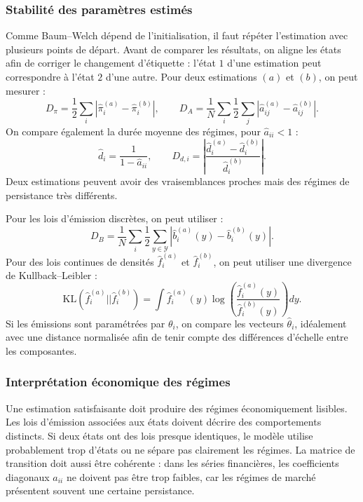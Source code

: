\documentclass[11pt]{article}
\begin{document}
\subsubsection{Stabilité des paramètres estimés}

Comme Baum--Welch dépend de l'initialisation, il faut répéter l'estimation avec plusieurs points de départ. Avant de comparer les résultats, on aligne les états afin de corriger le changement d'étiquette : l'état \(1\) d'une estimation peut correspondre à l'état \(2\) d'une autre. Pour deux estimations \((a)\) et \((b)\), on peut mesurer :
\[
D_{\pi}=\frac12\sum_i
\left|\widehat{\pi}^{(a)}_i-\widehat{\pi}^{(b)}_i\right|,
\qquad
D_A=
\frac1N\sum_i\frac12\sum_j
\left|\widehat{a}^{(a)}_{ij}-\widehat{a}^{(b)}_{ij}\right|.
\]
On compare également la durée moyenne des régimes, pour $\widehat{a}_{ii} < 1$ :
\[
\widehat{d}_i=\frac{1}{1-\widehat{a}_{ii}},
\qquad
D_{d,i}
=
\left|
\frac{\widehat{d}^{(a)}_i-\widehat{d}^{(b)}_i}
{\widehat{d}^{(b)}_i}
\right|.
\]
Deux estimations peuvent avoir des vraisemblances proches mais des régimes de persistance très différents.

Pour les lois d'émission discrètes, on peut utiliser :
\[
D_B=
\frac1N\sum_i
\frac12\sum_{y\in\mathcal{Y}}
\left|\widehat{b}^{(a)}_i(y)-\widehat{b}^{(b)}_i(y)\right|.
\]
Pour des lois continues de densités \(\widehat f_i^{(a)}\) et \(\widehat f_i^{(b)}\), on peut utiliser une divergence de Kullback--Leibler :
\[
\mathrm{KL}(\widehat f_i^{(a)}||\widehat f_i^{(b)})
=
\int \widehat f_i^{(a)}(y)
\log\left(
\frac{\widehat f_i^{(a)}(y)}
{\widehat f_i^{(b)}(y)}
\right)dy.
\]
Si les émissions sont paramétrées par \(\theta_i\), on compare les vecteurs \(\widehat{\theta}_i\), idéalement avec une distance normalisée afin de tenir compte des différences d'échelle entre les composantes.

\subsubsection{Interprétation économique des régimes}

Une estimation satisfaisante doit produire des régimes économiquement lisibles. Les lois d'émission associées aux états doivent décrire des comportements distincts. Si deux états ont des lois presque identiques, le modèle utilise probablement trop d'états ou ne sépare pas clairement les régimes. La matrice de transition doit aussi être cohérente : dans les séries financières, les coefficients diagonaux \(a_{ii}\) ne doivent pas être trop faibles, car les régimes de marché présentent souvent une certaine persistance.
\end{document}
